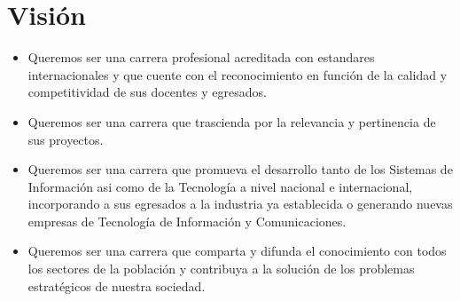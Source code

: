 \section{Visión}\label{sec:cs-vision}

\begin{itemize}
\item Queremos ser una carrera profesional acreditada con estandares internacionales y que cuente con el 
reconocimiento en función de la calidad y competitividad de sus docentes y egresados.

\item Queremos ser una carrera que trascienda por la relevancia y pertinencia de sus proyectos.

\item Queremos ser una carrera que promueva el desarrollo tanto de los Sistemas de Información
asi como de la Tecnologí­a a nivel nacional e internacional, incorporando a sus egresados a la industria
ya establecida o generando nuevas empresas de Tecnologí­a de Información y Comunicaciones.

\item Queremos ser una carrera que comparta y difunda el conocimiento con todos los sectores de la población 
y contribuya a la solución de los problemas estratégicos de nuestra sociedad.
\end{itemize}
